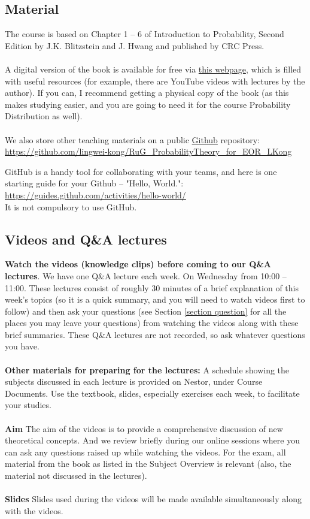 \documentclass[openany]{article}
\begin{document}
\subsection{Material}
The course is based on Chapter 1 – 6 of Introduction to Probability, Second Edition by J.K. Blitzstein and J. Hwang and published by CRC Press. \\~\\
A digital version of the book is available for free via \href{https://projects.iq.harvard.edu/stat110/home}{this webpage}, which
is filled with useful resources (for example, there are YouTube videos with
lectures by the author). If you can, I recommend getting a physical copy of
the book (as this makes studying easier, and you are going to need it for the course Probability Distribution as well). \\~\\
We also store other teaching materials on a public \href{https://github.com/}{Github} repository:\\ \href{https://github.com/lingwei-kong/RuG_ProbabilityTheory_for_EOR_LKong}{https://github.com/lingwei-kong/RuG\_ProbabilityTheory\_for\_EOR\_LKong}

GitHub is a handy tool for collaborating with your teams, and here is one starting guide for your Github -- "Hello, World.":
\href{https://guides.github.com/activities/hello-world/}{https://guides.github.com/activities/hello-world/} \\
It is not compulsory to use GitHub.
\subsection{Videos and Q\&A lectures}
\textbf{Watch the videos (knowledge clips) before coming to our Q\&A lectures}. We have one Q\&A lecture each week. On Wednesday from 10:00 – 11:00. These lectures consist of roughly 30
minutes of a brief explanation of this week’s topics (so it is a quick summary, and you will need to watch videos first to follow) and then ask your questions (see Section \ref{section question} for all the places you may leave your questions) from watching the videos along with these brief summaries. These Q\&A lectures are not recorded, so ask whatever questions you have.\\~\\ 
\textbf{Other materials for preparing for the lectures:} A schedule showing the subjects discussed in each lecture is provided on Nestor, under Course Documents. Use the textbook, slides, especially exercises each week, to facilitate your studies. \\~\\
\textbf{Aim} The aim of the videos is to provide a comprehensive discussion of new
theoretical concepts. And we review briefly during our online sessions where you can ask any questions raised up while watching the videos. For the exam, all material from the book as listed in the Subject Overview is relevant (also, the material not discussed in
the lectures).\\~\\
\textbf{Slides} Slides used during the videos will be made available simultaneously along with the videos. 
\end{document}
